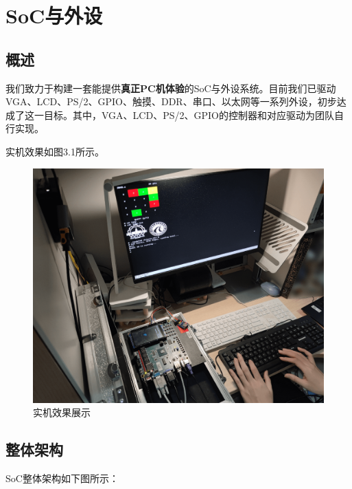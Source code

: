 

\chapter{SoC与外设}

\section{概述}

我们致力于构建一套能提供\textbf{真正PC机体验}的SoC与外设系统。目前我们已驱动VGA、LCD、PS/2、GPIO、触摸、DDR、串口、以太网等一系列外设，初步达成了这一目标。其中，VGA、LCD、PS/2、GPIO的控制器和对应驱动为团队自行实现。

实机效果如图3.1所示。

\begin{figure}[htb] %
\centering %
\includegraphics[width=12cm]{img/sys.png}
\caption{实机效果展示} %
\label{pic1} %
\end{figure}

\newpage

\section{整体架构}

SoC整体架构如下图所示：

